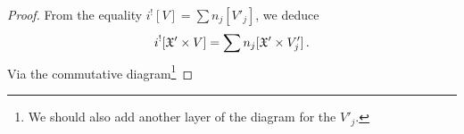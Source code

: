 \documentclass[a4paper,12pt]{article} %
\newcommand{\on}[1]{\operatorname{#1}}
\theoremstyle{definition}
\theoremstyle{plain}%
\renewcommand{\phi}{\varphi}
\begin{document}
\begin{proof}  
From the equality $i^! [V] = \sum n_j [V'_j]$, we deduce 
$$i^![\frak X' \times V] = \sum n_j [\frak X' \times V'_j]\, .$$ 
Via the commutative diagram\footnote{We should also add another layer of the diagram for the $V'_j$. 
}




\end{proof}
\end{document}
